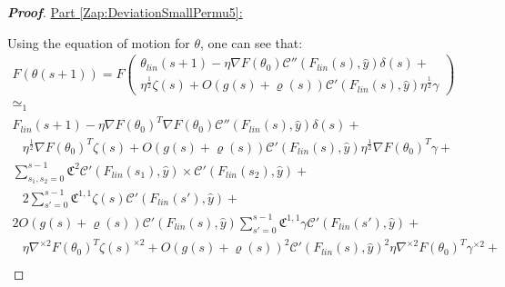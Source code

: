 \documentclass{article} %
\begin{document}
\begin{proof}[\textbf{Proof}]
\underline{Part \ref{Zap:DeviationSmallPermu5}:}

Using the equation of motion for \(\theta\), one can see that:
\begin{equation}
\begin{array}{c}
F\left(\theta\left(s+1\right)\right)=F\left(\begin{array}{c}
\theta_{lin}\left(s+1\right)-\eta\nabla F\left(\theta_{0}\right)\mathcal{C}''\left(F_{lin}\left(s\right),\hat{y}\right)\delta\left(s\right)+\\
\eta^{\frac{1}{2}}\zeta\left(s\right)+O\left(g\left(s\right)+\varrho\left(s\right)\right)\mathcal{C}'\left(F_{lin}\left(s\right),\hat{y}\right)\eta^{\frac{1}{2}}\gamma
\end{array}\right)\\
\simeq_{1}\\
F_{lin}\left(s+1\right)-\eta\nabla F\left(\theta_{0}\right)^{T}\nabla F\left(\theta_{0}\right)\mathcal{C}''\left(F_{lin}\left(s\right),\hat{y}\right)\delta\left(s\right)+\\
\begin{array}{c}
\\
\\
\end{array}\eta^{\frac{1}{2}}\nabla F\left(\theta_{0}\right)^{T}\zeta\left(s\right)+O\left(g\left(s\right)+\varrho\left(s\right)\right)\mathcal{C}'\left(F_{lin}\left(s\right),\hat{y}\right)\eta^{\frac{1}{2}}\nabla F\left(\theta_{0}\right)^{T}\gamma+\\
\sum_{s_{1},s_{2}=0}^{s-1}\mathfrak{C}^{2}\mathcal{C}'\left(F_{lin}\left(s_{1}\right),\hat{y}\right)\times\mathcal{C}'\left(F_{lin}\left(s_{2}\right),\hat{y}\right)+\\
\begin{array}{c}
\\
\\
\end{array}2\sum_{s'=0}^{s-1}\mathfrak{C}^{1,1}\zeta\left(s\right)\mathcal{C}'\left(F_{lin}\left(s'\right),\hat{y}\right)+\\
2O\left(g\left(s\right)+\varrho\left(s\right)\right)\mathcal{C}'\left(F_{lin}\left(s\right),\hat{y}\right)\sum_{s'=0}^{s-1}\mathfrak{C}^{1,1}\gamma\mathcal{C}'\left(F_{lin}\left(s'\right),\hat{y}\right)+\\
\begin{array}{c}
\\
\\
\end{array}\eta\nabla^{\times2}F\left(\theta_{0}\right)^{T}\zeta\left(s\right)^{\times2}+O\left(g\left(s\right)+\varrho\left(s\right)\right)^{2}\mathcal{C}'\left(F_{lin}\left(s\right),\hat{y}\right)^{2}\eta\nabla^{\times2}F\left(\theta_{0}\right)^{T}\gamma^{\times2}+\\

\end{array}
\end{equation}
\end{proof}
\end{document}
